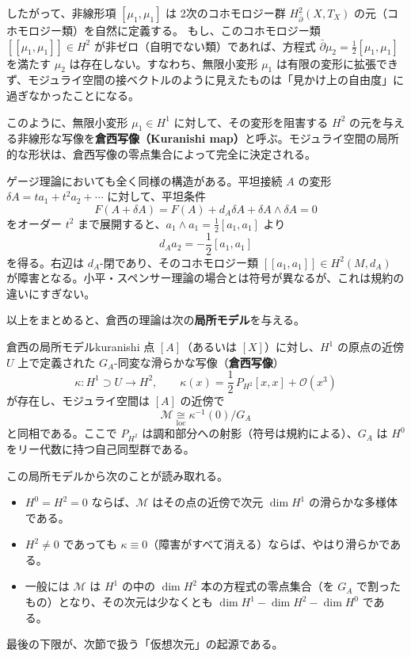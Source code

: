 \documentclass[uplatex, dvipdfmx, book]{jsbook}
\begin{document}
したがって、非線形項 $[\mu_1, \mu_1]$ は 2次のコホモロジー群 $H_{\bar{\partial}}^2(X, T_X)$ の元（コホモロジー類）を自然に定義する。
もし、このコホモロジー類 $[[\mu_1, \mu_1]] \in H^2$ が非ゼロ（自明でない類）であれば、方程式 $\bar{\partial} \mu_2 = \frac{1}{2} [\mu_1, \mu_1]$ を満たす $\mu_2$ は存在しない。すなわち、無限小変形 $\mu_1$ は有限の変形に拡張できず、モジュライ空間の接ベクトルのように見えたものは「見かけ上の自由度」に過ぎなかったことになる。

このように、無限小変形 $\mu_1 \in H^1$ に対して、その変形を阻害する $H^2$ の元を与える非線形な写像を\textbf{倉西写像（Kuranishi map）}と呼ぶ。モジュライ空間の局所的な形状は、倉西写像の零点集合によって完全に決定される。

ゲージ理論においても全く同様の構造がある。平坦接続 $A$ の変形 $\delta A = t a_1 + t^2 a_2 + \cdots$ に対して、平坦条件
\begin{equation}
    F(A + \delta A) = F(A) + d_A \delta A + \delta A \wedge \delta A = 0
\end{equation}
をオーダー $t^2$ まで展開すると、$a_1 \wedge a_1 = \frac{1}{2}[a_1, a_1]$ より
\begin{equation}
    d_A a_2 = -\frac{1}{2}[a_1, a_1]
\end{equation}
を得る。右辺は $d_A$-閉であり、そのコホモロジー類 $[[a_1, a_1]] \in H^2(M, d_A)$ が障害となる。小平・スペンサー理論の場合とは符号が異なるが、これは規約の違いにすぎない。

以上をまとめると、倉西の理論\cite{kuranishi1962}は次の\textbf{局所モデル}を与える。

\begin{mythm}{倉西の局所モデル}{kuranishi}
点 $[A]$（あるいは $[X]$）に対し、$H^1$ の原点の近傍 $U$ 上で定義された $G_A$-同変な滑らかな写像（\textbf{倉西写像}）
\begin{equation*}
    \kappa: H^1 \supset U \to H^2, \qquad \kappa(x) = \frac{1}{2}\,P_{H^2}[x, x] + \mathcal{O}(x^3)
\end{equation*}
が存在し、モジュライ空間は $[A]$ の近傍で
\begin{equation*}
    \mathcal{M} \underset{\text{loc}}{\cong} \kappa^{-1}(0) / G_A
\end{equation*}
と同相である。ここで $P_{H^2}$ は調和部分への射影（符号は規約による）、$G_A$ は $H^0$ をリー代数に持つ自己同型群である。
\end{mythm}

この局所モデルから次のことが読み取れる。
\begin{itemize}
    \item $H^0 = H^2 = 0$ ならば、$\mathcal{M}$ はその点の近傍で次元 $\dim H^1$ の滑らかな多様体である。
    \item $H^2 \neq 0$ であっても $\kappa \equiv 0$（障害がすべて消える）ならば、やはり滑らかである。
    \item 一般には $\mathcal{M}$ は $H^1$ の中の $\dim H^2$ 本の方程式の零点集合（を $G_A$ で割ったもの）となり、その次元は少なくとも $\dim H^1 - \dim H^2 - \dim H^0$ である。
\end{itemize}
最後の下限が、次節で扱う「仮想次元」の起源である。
\end{document}
